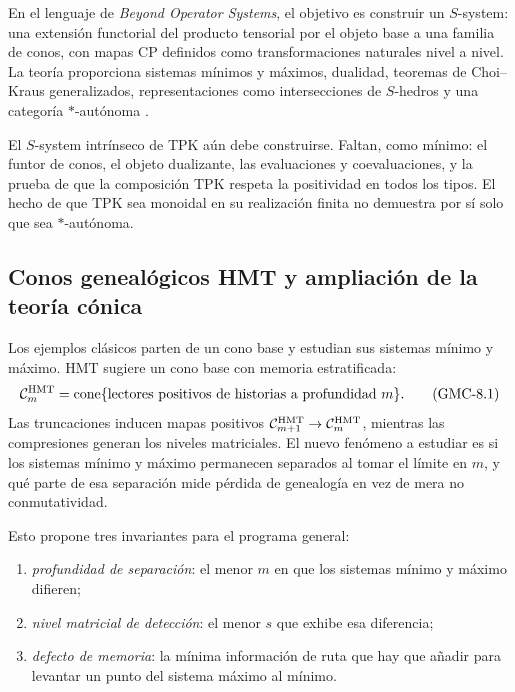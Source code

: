 En el lenguaje de \emph{Beyond Operator Systems}, el objetivo es construir un
$S$-system: una extensión functorial del producto tensorial por el objeto base
a una familia de conos, con mapas CP definidos como transformaciones
naturales nivel a nivel. La teoría proporciona sistemas mínimos y máximos,
dualidad, teoremas de Choi--Kraus generalizados, representaciones como
intersecciones de $S$-hedros y una categoría $*$-autónoma
\citep{delescoves2026beyond}.

\begin{workbox}
El $S$-system intrínseco de TPK aún debe construirse. Faltan, como mínimo: el
funtor de conos, el objeto dualizante, las evaluaciones y coevaluaciones, y la
prueba de que la composición TPK respeta la positividad en todos los tipos.
El hecho de que TPK sea monoidal en su realización finita no demuestra por sí
solo que sea $*$-autónoma.
\end{workbox}

\subsection{Conos genealógicos HMT y ampliación de la teoría cónica}

Los ejemplos clásicos parten de un cono base y estudian sus sistemas mínimo y
máximo. HMT sugiere un cono base con memoria estratificada:
\[
 \mathcal C_m^{\rm HMT}
 =\operatorname{cone}\{\text{lectores positivos de historias a profundidad }m\}.
 \tag{GMC-8.1}
\]
Las truncaciones inducen mapas positivos
$\mathcal C_{m+1}^{\rm HMT}\to\mathcal C_m^{\rm HMT}$, mientras las
compresiones generan los niveles matriciales. El nuevo fenómeno a estudiar es
si los sistemas mínimo y máximo permanecen separados al tomar el límite en
$m$, y qué parte de esa separación mide pérdida de genealogía en vez de mera
no conmutatividad.

Esto propone tres invariantes para el programa general:

\begin{enumerate}
 \item \emph{profundidad de separación}: el menor $m$ en que los sistemas
 mínimo y máximo difieren;
 \item \emph{nivel matricial de detección}: el menor $s$ que exhibe esa
 diferencia;
 \item \emph{defecto de memoria}: la mínima información de ruta que hay que
 añadir para levantar un punto del sistema máximo al mínimo.
\end{enumerate}

